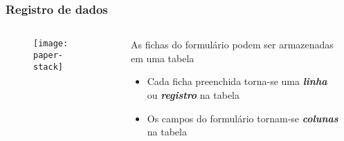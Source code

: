 \documentclass[t, 10pt, aspectratio=169, table, x11names]{beamer}
\begin{document}
	\begin{frame}
		\frametitle{Registro de dados}
		\begin{columns}[t]
			\begin{column}{0.40\textwidth}
				\begin{figure}[h]
					\texttt{[image: paper-stack]}
				\end{figure}
			\end{column}
			\begin{column}{0.55\textwidth}
				\vspace{2mm}
				
				As fichas do formulário podem ser armazenadas em uma tabela 
				\begin{itemize}
					\bigskip\bigskip
					\item Cada ficha preenchida torna-se uma \textbf\textit{linha} ou \textbf{\textit{registro}} na tabela
					\bigskip
					\item Os campos do formulário tornam-se \textbf{\textit{colunas}} na tabela
				\end{itemize}
			\end{column}
			\begin{column}{0.05\textwidth}
			\end{column}
		\end{columns}
	\end{frame}
\end{document}
